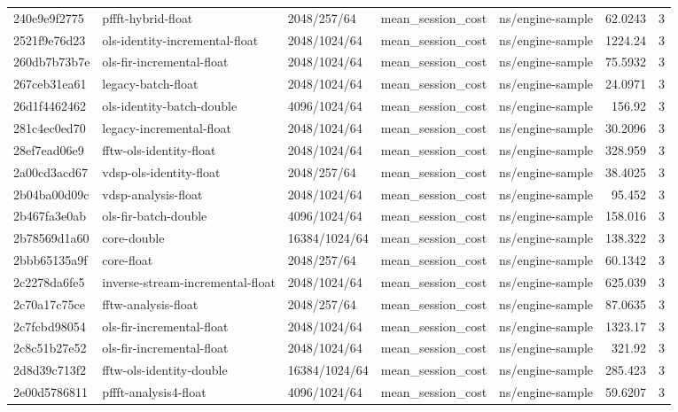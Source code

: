 \begin{longtable}{lllllrr}
240e9e9f2775 & pffft-hybrid-float & 2048/257/64 & mean\_session\_cost & ns/engine-sample & 62.0243 & 3 \\
2521f9e76d23 & ols-identity-incremental-float & 2048/1024/64 & mean\_session\_cost & ns/engine-sample & 1224.24 & 3 \\
260db7b73b7e & ols-fir-incremental-float & 2048/1024/64 & mean\_session\_cost & ns/engine-sample & 75.5932 & 3 \\
267ceb31ea61 & legacy-batch-float & 2048/1024/64 & mean\_session\_cost & ns/engine-sample & 24.0971 & 3 \\
26d1f4462462 & ols-identity-batch-double & 4096/1024/64 & mean\_session\_cost & ns/engine-sample & 156.92 & 3 \\
281c4ec0ed70 & legacy-incremental-float & 2048/1024/64 & mean\_session\_cost & ns/engine-sample & 30.2096 & 3 \\
28ef7ead06e9 & fftw-ols-identity-float & 2048/1024/64 & mean\_session\_cost & ns/engine-sample & 328.959 & 3 \\
2a00cd3acd67 & vdsp-ols-identity-float & 2048/257/64 & mean\_session\_cost & ns/engine-sample & 38.4025 & 3 \\
2b04ba00d09c & vdsp-analysis-float & 2048/1024/64 & mean\_session\_cost & ns/engine-sample & 95.452 & 3 \\
2b467fa3e0ab & ols-fir-batch-double & 4096/1024/64 & mean\_session\_cost & ns/engine-sample & 158.016 & 3 \\
2b78569d1a60 & core-double & 16384/1024/64 & mean\_session\_cost & ns/engine-sample & 138.322 & 3 \\
2bbb65135a9f & core-float & 2048/257/64 & mean\_session\_cost & ns/engine-sample & 60.1342 & 3 \\
2c2278da6fe5 & inverse-stream-incremental-float & 2048/1024/64 & mean\_session\_cost & ns/engine-sample & 625.039 & 3 \\
2c70a17c75ce & fftw-analysis-float & 2048/257/64 & mean\_session\_cost & ns/engine-sample & 87.0635 & 3 \\
2c7fcbd98054 & ols-fir-incremental-float & 2048/1024/64 & mean\_session\_cost & ns/engine-sample & 1323.17 & 3 \\
2c8c51b27e52 & ols-fir-incremental-float & 2048/1024/64 & mean\_session\_cost & ns/engine-sample & 321.92 & 3 \\
2d8d39c713f2 & fftw-ols-identity-double & 16384/1024/64 & mean\_session\_cost & ns/engine-sample & 285.423 & 3 \\
2e00d5786811 & pffft-analysis4-float & 4096/1024/64 & mean\_session\_cost & ns/engine-sample & 59.6207 & 3 \\

\end{longtable}
